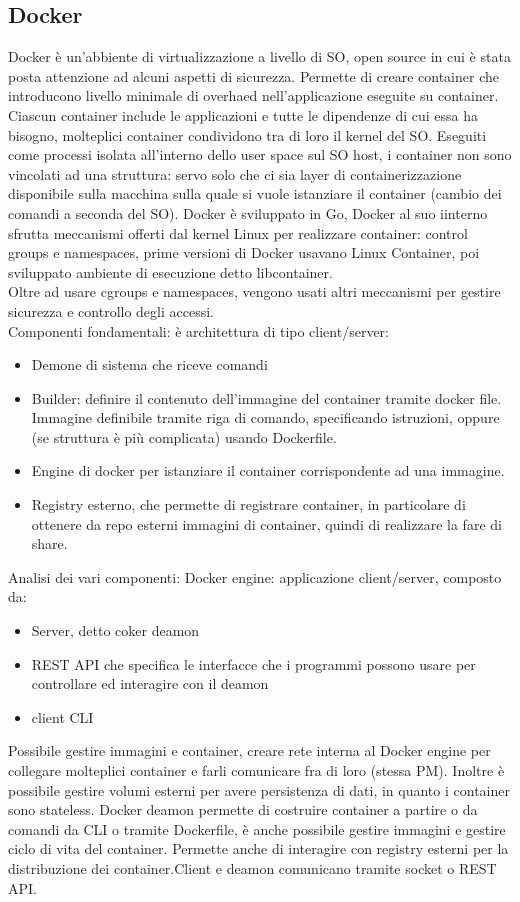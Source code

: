 \documentclass{article}
\begin{document}
\subsection{Docker}
Docker è un'abbiente di virtualizzazione a livello di SO, open source in cui è stata posta attenzione ad alcuni aspetti di sicurezza. Permette di creare container che introducono livello minimale di overhaed nell'applicazione eseguite su container.\\ Ciascun container include le applicazioni e tutte le dipendenze di cui essa ha bisogno, molteplici container condividono tra di loro il kernel del SO. Eseguiti come processi isolata all'interno dello user space sul SO host, i container non sono vincolati ad una struttura: servo solo che ci sia layer di containerizzazione disponibile sulla macchina sulla quale si vuole istanziare il container (cambio dei comandi a seconda del SO). Docker è sviluppato in Go, Docker al suo iinterno sfrutta meccanismi offerti dal kernel Linux per realizzare container: control groups e namespaces, prime versioni di Docker usavano Linux Container, poi sviluppato ambiente di esecuzione detto libcontainer.\\ Oltre ad usare cgroups e namespaces, vengono usati altri meccanismi per gestire sicurezza e controllo degli accessi.\\Componenti fondamentali: è architettura di tipo client/server:
\begin{itemize}
\item Demone di sistema che riceve comandi
\item Builder: definire il contenuto dell'immagine del container tramite docker file. Immagine definibile tramite riga di comando, specificando istruzioni, oppure (se struttura è più complicata) usando Dockerfile.
\item Engine di docker per istanziare il container corrispondente ad una immagine.
\item Registry esterno, che permette di registrare container, in particolare di ottenere da repo esterni immagini di container, quindi di realizzare la fare di share.
\end{itemize}
Analisi dei vari componenti:
Docker engine: applicazione client/server, composto da:
\begin{itemize}
\item Server, detto coker deamon
\item REST API che specifica le interfacce che i programmi possono usare per controllare ed interagire con il deamon
\item client CLI 
\end{itemize}
Possibile gestire immagini e container, creare rete interna al Docker engine per collegare molteplici container e farli comunicare fra di loro (stessa PM). Inoltre è possibile gestire volumi esterni per avere persistenza di dati, in quanto i container sono stateless.
Docker deamon permette di costruire container a partire o da comandi da CLI o tramite Dockerfile, è anche possibile gestire immagini e gestire ciclo di vita del container. Permette anche di interagire con registry esterni per la distribuzione dei container.Client e deamon comunicano tramite socket o REST API.
\end{document}
